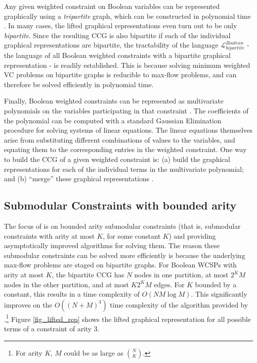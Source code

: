   Any given weighted constraint on Boolean variables can be represented graphically using a \emph{tripartite} graph, which can be constructed in polynomial time \cite{K:CP:08}. In many cases, the lifted graphical representations even turn out to be only \emph{bipartite}. Since the resulting CCG is also bipartite if each of the individual graphical representations are bipartite, the tractability of the language $\mathcal{L}_{bipartite}^{Boolean}$ - the language of all Boolean weighted constraints with a bipartite graphical representation - is readily established. This is because solving minimum weighted VC problems on bipartite graphs is reducible to max-flow problems, and can therefore be solved efficiently in polynomial time.
  
  Finally, Boolean weighted constraints can be represented as multivariate polynomials on the variables participating in that constraint \cite{ZSH:CSC:10,K:CP:08}. The coefficients of the polynomial can be computed with a standard Gaussian Elimination procedure for solving systems of linear equations. The linear equations themselves arise from substituting different combinations of values to the variables, and equating them to the corresponding entries in the weighted constraint. One way to build the CCG of a given weighted constraint is: (a) build the graphical representations for each of the individual terms in the multivariate polynomial; and (b) ``merge'' these graphical representations \cite{K:CP:08}.

\subsection{Submodular Constraints with bounded arity}
  The focus of \cite{KCK:SARA:13} is on bounded arity submodular constraints (that is, submodular constraints with arity at most $K$, for some constant $K$) and providing asymptotically improved algorithms for solving them. The reason these submodular constraints can be solved more efficiently is because the underlying max-flow problems are staged on bipartite graphs. For Boolean WCSPs with arity at most $K$, the bipartite CCG has $N$ nodes in one partition, at most $2^K M$ nodes in the other partition, and at most $K 2^K M$ edges. For $K$ bounded by a constant, this results in a time complexity of $O(N M \log M)$. This significantly improves on the $O((N+M)^{3})$ time complexity of the algorithm provided by \cite{ZSH:CSC:10}.\footnote{For arity $K$, $M$ could be as large as $N \choose K$.} Figure \ref{fig_lifted_rep} shows the lifted graphical representation for all possible terms of a constraint of arity $3$.
  
